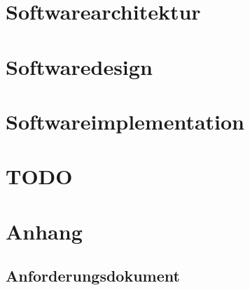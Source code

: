 \documentclass[12pt,a4paper,bibliography=totocnumbered,listof=totocnumbered]{scrartcl}
\begin{document}
%


\section{Softwarearchitektur}
\sloppy

\newpage
\section{Softwaredesign}
\sloppy

\newpage
\section{Softwareimplementation}
\sloppy

\newpage
\section{TODO}

\section{Anhang}
\subsection{Anforderungsdokument}  \label{Anforderungsdokument}

\sloppy
\end{document}
